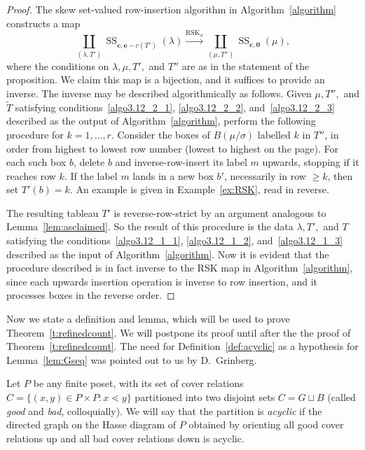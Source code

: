 \documentclass[ALCO,ThmDefs,Unicode,epreuves]{cedram}
\DeclareMathOperator{\Semi}{SS}
\newcommand{\bfc}{\mathbf{c}}
\newcommand{\bfe}{\mathbf{e}}
\newcommand{\wt}{\widetilde}
\begin{document}
\begin{proof}
 The skew set-valued row-insertion algorithm in Algorithm~\ref{algorithm} constructs a map
\begin{equation}\label{eq:ssmap}
\coprod_{(\lambda, T')} \Semi_{\bfc, \bfe-c(T')}(\lambda) \xrightarrow{\text{RSK}_\sigma}\coprod_{(\mu,T'')} \Semi_{\bfc, \mathbf{0}}(\mu),
\end{equation}
where the conditions on $\lambda,\mu,T',$ and $T''$ are as in the statement of the proposition. We claim this map is a bijection, and it suffices to provide an inverse. The inverse may be described algorithmically as follows. Given $\mu, T'',$ and $\wt T$ satisfying conditions~\eqref{algo3.12_2_1}, \eqref{algo3.12_2_2}, and~\eqref{algo3.12_2_3} described as the output of Algorithm~\ref{algorithm}, perform the following procedure for $k=1,\ldots, r$. Consider the boxes of $B(\mu/\sigma)$ labelled $k$ in $T''$, in order from highest to lowest row number (\ie lowest to highest on the page). For each such box $b$, delete $b$ and inverse-row-insert its label $m$ upwards, stopping if it reaches row $k$. If the label $m$ lands in a new box $b'$, necessarily in row $\ge k$, then set $T'(b) = k$. An example is given in Example~\ref{ex:RSK}, read in reverse.

The resulting tableau $T'$ is reverse-row-strict by an argument analogous to Lemma~\ref{lem:asclaimed}. So the result of this procedure is the data $\lambda,T',$ and $T$ satisfying the conditions~\eqref{algo3.12_1_1}, \eqref{algo3.12_1_2}, and~\eqref{algo3.12_1_3} described as the input of Algorithm~\ref{algorithm}. 
Now it is evident that the procedure described is in fact inverse to the RSK map in Algorithm~\ref{algorithm}, since each upwards insertion operation is inverse to row insertion, and it processes boxes in the reverse order.
\end{proof}

Now we state a definition and lemma, which will be used to prove Theorem~\ref{t:refinedcount}. We will postpone its proof until after the the proof of Theorem~\ref{t:refinedcount}. The need for Definition~\ref{def:acyclic} as a hypothesis for Lemma~\ref{lem:Gseq} was pointed out to us by D.~Grinberg.

\begin{defi}\label{def:acyclic}
Let $P$ be any finite poset, with its set of cover relations $C = \{(x,y)\in P\times P: x\lessdot y\}$ partitioned into two disjoint sets $C=G\sqcup B$ (called \emph{good} and \emph{bad}, colloquially). We will say that the partition is \emph{acyclic} if the directed graph on the Hasse diagram of $P$ obtained by orienting all good cover relations up and all bad cover relations down is acyclic.
\end{defi}
\end{document}

